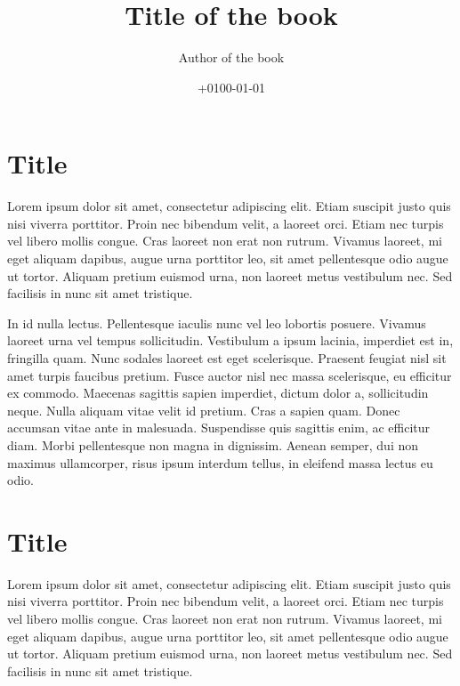 \documentclass[
  a5paper,
  smalldemyvopaper,10pt,twoside,onecolumn,openright,extrafontsizes,hidelinks]{memoir}
\title{Title of the book}
\author{Author of the book}
\date{+0100-01-01}
\renewcommand*\contentsname{Table of contents}
\newcommand\contentsname{Table of contents}
\begin{document}
\frontmatter
\maketitle

\renewcommand*\contentsname{Contents}
{
\setcounter{tocdepth}{0}
\tableofcontents
}

\mainmatter
{}

\chapter{Title}\label{title}

Lorem ipsum dolor sit amet, consectetur adipiscing elit. Etiam suscipit
justo quis nisi viverra porttitor. Proin nec bibendum velit, a laoreet
orci. Etiam nec turpis vel libero mollis congue. Cras laoreet non erat
non rutrum. Vivamus laoreet, mi eget aliquam dapibus, augue urna
porttitor leo, sit amet pellentesque odio augue ut tortor. Aliquam
pretium euismod urna, non laoreet metus vestibulum nec. Sed facilisis in
nunc sit amet tristique.

In id nulla lectus. Pellentesque iaculis nunc vel leo lobortis posuere.
Vivamus laoreet urna vel tempus sollicitudin. Vestibulum a ipsum
lacinia, imperdiet est in, fringilla quam. Nunc sodales laoreet est eget
scelerisque. Praesent feugiat nisl sit amet turpis faucibus pretium.
Fusce auctor nisl nec massa scelerisque, eu efficitur ex commodo.
Maecenas sagittis sapien imperdiet, dictum dolor a, sollicitudin neque.
Nulla aliquam vitae velit id pretium. Cras a sapien quam. Donec accumsan
vitae ante in malesuada. Suspendisse quis sagittis enim, ac efficitur
diam. Morbi pellentesque non magna in dignissim. Aenean semper, dui non
maximus ullamcorper, risus ipsum interdum tellus, in eleifend massa
lectus eu odio.


\chapter{Title}\label{title-1}

Lorem ipsum dolor sit amet, consectetur adipiscing elit. Etiam suscipit
justo quis nisi viverra porttitor. Proin nec bibendum velit, a laoreet
orci. Etiam nec turpis vel libero mollis congue. Cras laoreet non erat
non rutrum. Vivamus laoreet, mi eget aliquam dapibus, augue urna
porttitor leo, sit amet pellentesque odio augue ut tortor. Aliquam
pretium euismod urna, non laoreet metus vestibulum nec. Sed facilisis in
nunc sit amet tristique.
\end{document}
